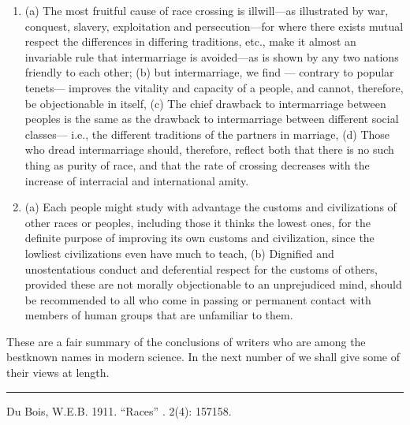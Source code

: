 \documentclass[letterpaper,10pt,english]{jupyterBook}
\begin{document}
\begin{enumerate}
\item {} 
\sphinxAtStartPar
(a) The most fruitful cause of race crossing is ill\sphinxhyphen{}will—as illustrated by war, conquest, slavery, exploitation and persecution—for where there exists mutual respect the differences in differing traditions, etc., make it almost an invariable rule that intermarriage is avoided—as is shown by any two nations friendly to each other; (b) but intermarriage, we find — contrary to popular tenets— improves the vitality and capacity of a people, and cannot, therefore, be objectionable in itself, (c) The chief drawback to intermarriage between peoples is the same as the drawback to intermarriage between different social classes— i.e., the different traditions of the partners in marriage, (d) Those who dread intermarriage should, therefore, reflect both that there is no such thing as purity of race, and that the rate of crossing decreases with the increase of interracial and international amity.

\item {} 
\sphinxAtStartPar
(a) Each people  might study with advantage the customs and civilizations of other races or peoples, including those it thinks the lowest ones, for the definite purpose of improving its own customs and civilization, since the lowliest civilizations even have much to teach, (b) Dignified and unostentatious conduct and deferential respect for the customs of others, provided these are not morally objectionable to an unprejudiced mind, should be recommended to all who come in passing or permanent contact with members of human groups that are unfamiliar to them.

\end{enumerate}

\sphinxAtStartPar
These are a fair summary of the conclusions of writers who are among the best\sphinxhyphen{}known names in modern science. In the next number of  we shall give some of their views at length.


\bigskip\hrule\bigskip


\sphinxAtStartPar
{} Du Bois, W.E.B. 1911. “Races”  . 2(4): 157\sphinxhyphen{}158.
\end{document}
